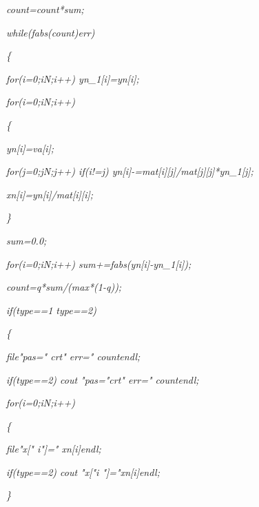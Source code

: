 \documentclass[a4paper,twoside]{book}
\begin{document}
\textit{\qquad count=count*sum;}

\textit{\qquad while(fabs(count)\TEXTsymbol{>}err)}

\textit{\qquad \{}

\textit{\qquad \qquad for(i=0;i\TEXTsymbol{<}N;i++) yn\_1[i]=yn[i];}

\textit{\qquad \qquad for(i=0;i\TEXTsymbol{<}N;i++)}

\textit{\qquad \qquad \{}

\textit{\qquad \qquad \qquad yn[i]=va[i];}

\textit{\qquad \qquad \qquad for(j=0;j\TEXTsymbol{<}N;j++) if(i!=j)
yn[i]-=mat[i][j]/mat[j][j]*yn\_1[j];}

\textit{\qquad \qquad \qquad xn[i]=yn[i]/mat[i][i];}

\textit{\qquad \qquad \}}

\textit{\qquad \qquad sum=0.0;}

\textit{\qquad \qquad for(i=0;i\TEXTsymbol{<}N;i++)
sum+=fabs(yn[i]-yn\_1[i]);}

\textit{\qquad \qquad count=q*sum/(max*(1-q));}

\textit{\qquad \qquad if(type==1 \TEXTsymbol{\vert}\TEXTsymbol{\vert}
type==2)}

\textit{\qquad \qquad \{}

\textit{\qquad \qquad \qquad file\TEXTsymbol{<}\TEXTsymbol{<}"pas="%
\TEXTsymbol{<}\TEXTsymbol{<}crt\TEXTsymbol{<}\TEXTsymbol{<}" err="%
\TEXTsymbol{<}\TEXTsymbol{<}count\TEXTsymbol{<}\TEXTsymbol{<}endl;}

\textit{\qquad \qquad \qquad if(type==2) cout\TEXTsymbol{<}\TEXTsymbol{<}%
"pas="\TEXTsymbol{<}\TEXTsymbol{<}crt\TEXTsymbol{<}\TEXTsymbol{<}" err="%
\TEXTsymbol{<}\TEXTsymbol{<}count\TEXTsymbol{<}\TEXTsymbol{<}endl;}

\textit{\qquad \qquad \qquad for(i=0;i\TEXTsymbol{<}N;i++)}

\textit{\qquad \qquad \qquad \{}

\textit{\qquad \qquad \qquad \qquad file\TEXTsymbol{<}\TEXTsymbol{<}"x["%
\TEXTsymbol{<}\TEXTsymbol{<}i\TEXTsymbol{<}\TEXTsymbol{<}"]="\TEXTsymbol{<}%
\TEXTsymbol{<}xn[i]\TEXTsymbol{<}\TEXTsymbol{<}endl;}

\textit{\qquad \qquad \qquad \qquad if(type==2) cout\TEXTsymbol{<}%
\TEXTsymbol{<}"x["\TEXTsymbol{<}\TEXTsymbol{<}i\TEXTsymbol{<}\TEXTsymbol{<}%
"]="\TEXTsymbol{<}\TEXTsymbol{<}xn[i]\TEXTsymbol{<}\TEXTsymbol{<}endl;}

\textit{\qquad \qquad \qquad \}}
\end{document}
